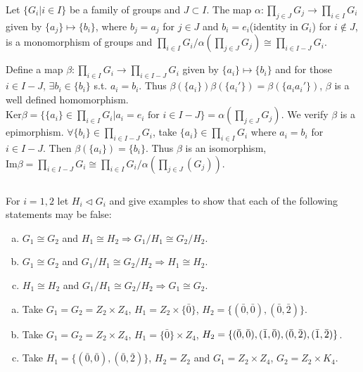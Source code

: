 $$ $$

\begin{ex}
    Let $\{G_{i}|i\in I\}$ be a family of groups and $J\subset I$. The map $\alpha: \prod\limits_{j\in J}G_{j}\to \prod\limits_{i\in I}G_{i}$ given by $\{a_{j}\}\mapsto \{b_{i}\}$, where $b_{j}=a_{j}$ for $j\in J$ and $b_{i}=e_{i}$(identity in $G_{i}$) for $i\notin J$, is a monomorphism of groups and $\prod\limits_{i\in I}G_{i} /\alpha(\prod\limits_{j\in J}G_{j})\cong \prod\limits_{i\in I-J}G_{i}$.
\end{ex}

\begin{answer}
    Define a map $\beta:\prod\limits_{i\in I}G_{i}\to \prod\limits_{i\in I-J}G_{i}$ given by $\{a_{i}\}\mapsto \{b_{i}\}$ and for those $i\in I-J$, $\exists b_{i}\in \{b_{i}\}$ s.t. $a_{i}=b_{i}$. Thus $\beta(\{a_{i}\})\beta(\{a_{i}'\})=\beta(\{a_{i}a_{i}'\})$, $\beta$ is a well defined homomorphism. $\mathrm{Ker}\beta=\{\{a_{i}\}\in\prod\limits_{i\in I}G_{i}|a_{i}=e_{i} \text{ for }i \in I-J\}=\alpha(\prod\limits_{j\in J}G_{j})$. We verify $\beta$ is a epimorphism. $\forall \{b_{i}\}\in \prod\limits_{i\in I-J}G_{i}$, take $\{a_{i}\}\in \prod\limits_{i\in I}G_{i}$ where $a_{i}=b_{i}$ for $i\in I-J$. Then $\beta(\{a_{i}\})=\{b_{i}\}$. Thus $\beta$ is an isomorphism, $\mathrm{Im}\beta=\prod\limits_{i\in I-J}G_{i}\cong \prod\limits_{i\in I}G_{i} /\alpha(\prod\limits_{j\in J}(G_{j}))$.
\end{answer}

$$ $$

\begin{ex}
    For $i=1,2$ let $H_{i}\lhd G_{i}$ and give examples to show that each of the following statements may be false:
    \begin{enumerate}[(a)]
        \item $G_{1}\cong G_{2}$ and $H_{1}\cong H_{2}\Rightarrow G_{1} /H_{1}\cong G_{2} /H_{2}$.
        \item $G_{1}\cong G_{2}$ and $G_{1}/ H_{1}\cong G_{2} / H_{2}\Rightarrow H_{1}\cong H_{2}$.
        \item $H_{1}\cong H_{2}$ and $G_{1}/ H_{1}\cong G_{2} / H_{2}\Rightarrow G_{1}\cong G_{2}$.
    \end{enumerate}
\end{ex}

\begin{answer}
    \begin{enumerate}[(a)]
        \item Take $G_{1}=G_{2}=Z_{2}\times Z_{4}$, $H_{1}=Z_{2}\times \{\bar{0}\}$, $H_{2}=\{(\bar{0},\bar{0}), (\bar{0}, \bar{2})\}$.
        \item Take $G_{1}=G_{2}=Z_{2}\times Z_{4}$, $H_{1}=\{\bar{0}\}\times Z_{4}$, $H_{2}=\{(\bar{0}, \bar{0}), (\bar{1}, \bar{0}), (\bar{0}, \bar{2}), \\(\bar{1}, \bar{2})\}$.
        \item Take $H_{1}=\{(\bar{0},\bar{0}), (\bar{0},\bar{2})\}$, $H_{2}=Z_{2}$ and $G_{1}=Z_{2}\times Z_{4}$, $G_{2}=Z_{2}\times K_{4}$.
    \end{enumerate}
\end{answer}
